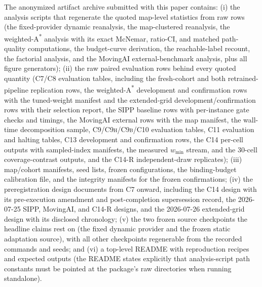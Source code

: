 \documentclass[letterpaper]{article} %
\newcommand{\stage}[1]{\textsc{#1}}
\begin{document}
The anonymized artifact archive submitted with this paper contains: (i) the analysis scripts that regenerate the quoted map-level statistics from raw rows (the fixed-provider dynamic reanalysis, the map-clustered reanalysis, the weighted-A\textsuperscript{*} analysis with its exact McNemar, ratio-CI, and matched path-quality computations, the budget-curve derivation, the reachable-label recount, the factorial analysis, and the MovingAI external-benchmark analysis, plus all figure generators); (ii) the raw paired evaluation rows behind every quoted quantity (\stage{C7}/\stage{C8} evaluation tables, including the fresh-cohort and both retrained-pipeline replication rows, the weighted-A\textsuperscript{*} development and confirmation rows with the tuned-weight manifest and the extended-grid development/confirmation rows with their selection report, the SIPP baseline rows with per-instance gate checks and timings, the MovingAI external rows with the map manifest, the wall-time decomposition sample, \stage{C9}/\stage{C9h}/\stage{C9b}/\stage{C10} evaluation tables, \stage{C11} evaluation and halting tables, \stage{C13} development and confirmation rows, the \stage{C14} per-cell outputs with sampled-index manifests, the measured $w_{\min}$ stream, and the 30-cell coverage-contrast outputs, and the \stage{C14-R} independent-draw replicates); (iii) map/cohort manifests, seed lists, frozen configurations, the binding-budget calibration file, and the integrity manifests for the frozen confirmations; (iv) the preregistration design documents from \stage{C7} onward, including the \stage{C14} design with its pre-execution amendment and post-completion supersession record, the 2026-07-25 SIPP, MovingAI, and \stage{C14-R} designs, and the 2026-07-26 extended-grid design with its disclosed chronology; (v) the two frozen source checkpoints the headline claims rest on (the fixed dynamic provider and the frozen static adaptation source), with all other checkpoints regenerable from the recorded commands and seeds; and (vi) a top-level README with reproduction recipes and expected outputs (the README states explicitly that analysis-script path constants must be pointed at the package's raw directories when running standalone).



\end{document}
